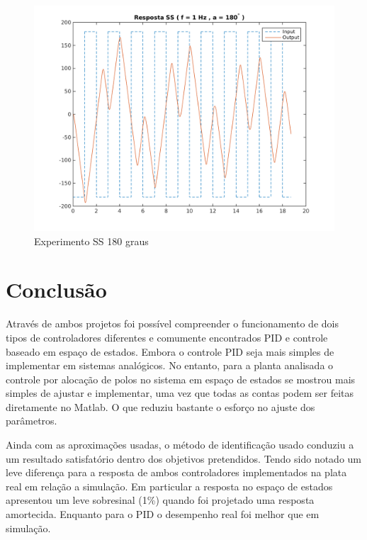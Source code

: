 \documentclass[a4paper,11pt]{article}
\begin{document}
\begin{figure}[H]
    \centering
    \includegraphics[width=0.8\linewidth]{tex/img/quanserss_s180num1.png}
    \caption{Experimento SS 180 graus}
    \label{fig:quanserss_s180num1}
\end{figure}


\section{Conclusão}

Através de ambos projetos foi possível compreender o funcionamento de dois tipos de controladores diferentes e comumente encontrados PID e controle baseado em espaço de estados. Embora o controle PID seja mais simples de implementar em sistemas analógicos. No entanto, para a planta analisada o controle por alocação de polos no sistema em espaço de estados se mostrou mais simples de ajustar e implementar, uma vez que todas as contas podem ser feitas diretamente no Matlab. O que reduziu bastante o esforço no ajuste dos parâmetros.

Ainda com as aproximações usadas, o método de identificação usado conduziu a um resultado satisfatório dentro dos objetivos pretendidos. Tendo sido notado um leve diferença para a resposta de ambos controladores implementados na plata real em relação a simulação. Em particular a resposta no espaço de estados apresentou um leve sobresinal (1\%) quando foi projetado uma resposta amortecida. Enquanto para o PID o desempenho real foi melhor que em simulação.

\end{document}
